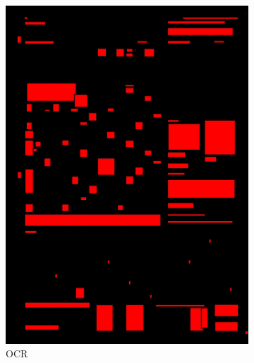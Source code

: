 \documentclass[aspectratio=1610]{beamer}
\begin{document}
\begin{frame}
  \begin{figure}
\centering
\begin{subfigure}{.25\textwidth}
  \centering
  \includegraphics[width=0.99\linewidth, clip=true, trim = 0mm 0mm 0mm 0mm]{figures/ocr/y3LXnnL.jpg}
  \caption{OCR}
\end{subfigure}%
\begin{subfigure}{.25\textwidth}
  \centering

\end{subfigure}
\end{figure}
\end{frame}
\end{document}
